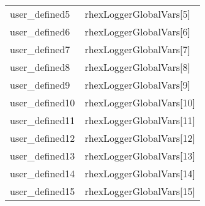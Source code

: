 \begin{center}
\begin{longtable}{|l|l|}
      user\_defined5 & rhexLoggerGlobalVars[5]\\
      user\_defined6 & rhexLoggerGlobalVars[6]\\
      user\_defined7 & rhexLoggerGlobalVars[7]\\ 
      user\_defined8 & rhexLoggerGlobalVars[8]\\
      user\_defined9 & rhexLoggerGlobalVars[9]\\
      user\_defined10 & rhexLoggerGlobalVars[10]\\ 
      user\_defined11 & rhexLoggerGlobalVars[11]\\
      user\_defined12 & rhexLoggerGlobalVars[12]\\
      user\_defined13 & rhexLoggerGlobalVars[13]\\ 
      user\_defined14 & rhexLoggerGlobalVars[14]\\
      user\_defined15 & rhexLoggerGlobalVars[15]\\
      \hline
\end{longtable}
\end{center}



